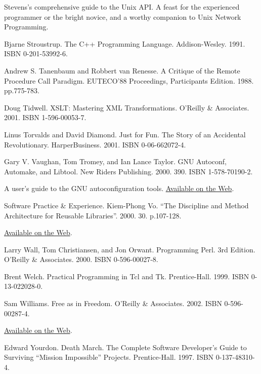 \documentclass[12pt,oneside]{book}
\begin{document}
\begin{thebibliography}{9}
Stevens's comprehensive guide to the Unix API. A feast for the experienced programmer or the bright novice, and a worthy companion to Unix Network Programming.

 Bjarne Stroustrup. The C++ Programming Language. Addison-Wesley. 1991. ISBN 0-201-53992-6.

 Andrew S. Tanenbaum and Robbert van Renesse. A Critique of the Remote Procedure Call Paradigm. EUTECO'88 Proceedings, Participants Edition. 1988. pp.775-783.

 Doug Tidwell. XSLT: Mastering XML Transformations. O'Reilly \&{}  Associates. 2001. ISBN 1-596-00053-7.

 Linus Torvalds and David Diamond. Just for Fun. The Story of an Accidental Revolutionary. HarperBusiness. 2001. ISBN 0-06-662072-4.

 Gary V. Vaughan, Tom Tromey, and Ian Lance Taylor. GNU Autoconf, Automake, and Libtool. New Riders Publishing. 2000. 390. ISBN 1-578-70190-2.

A user's guide to the GNU autoconfiguration tools. \href{http://sources.redhat.com/autobook/}{Available on the Web}.

 Software Practice \&{} Experience. Kiem-Phong Vo. “The Discipline and Method Architecture for Reusable Libraries”. 2000. 30. p.107-128.

\href{http://www.research.att.com/sw/tools/vcodex/dm-spe.ps}{Available on the Web}.

 Larry Wall, Tom Christiansen, and Jon Orwant. Programming Perl. 3rd Edition. O'Reilly \&{} Associates. 2000. ISBN 0-596-00027-8.

 Brent Welch. Practical Programming in Tcl and Tk. Prentice-Hall. 1999. ISBN 0-13-022028-0.

 Sam Williams. Free as in Freedom. O'Reilly \&{} Associates. 2002. ISBN 0-596-00287-4.

\href{http://www.oreilly.com/openbook/freedom/index.html}{Available on the Web}.

 Edward Yourdon. Death March. The Complete Software Developer's Guide to Surviving “Mission Impossible” Projects. Prentice-Hall. 1997. ISBN 0-137-48310-4. 
\end{thebibliography}



\end{document}
